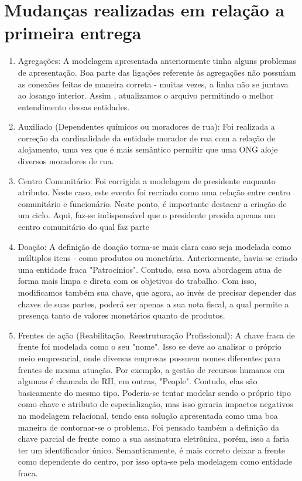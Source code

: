 \section{Mudanças realizadas em relação a primeira entrega}
\label{sec:entidades}

\begin{enumerate}
    \item Agregações: A modelagem apresentada anteriormente tinha alguns problemas de apresentação. Boa parte das ligações referente às agregações não possuíam as conexões feitas de maneira correta - muitas vezes, a linha não se juntava ao losango interior. Assim , atualizamos o arquivo permitindo o melhor entendimento dessas entidades.
    \item Auxiliado (Dependentes químicos ou moradores de rua): Foi realizada a correção da cardinalidade da entidade morador de rua com a relação de alojamento, uma vez que é mais semântico permitir que uma ONG aloje diversos moradores de rua.
    \item Centro Comunitário: Foi corrigida a modelagem de presidente enquanto atributo. Neste caso, este evento foi recriado como uma relação entre centro comunitário e funcionário. Neste ponto, é importante destacar a criação de um ciclo. Aqui, faz-se indispensável que o presidente presida apenas um centro comunitário do qual faz parte
    \item Doação: A definição de doação torna-se mais clara caso seja modelada como múltiplos itens - como produtos ou monetária. Anteriormente, havia-se criado uma entidade fraca "Patrocínios". Contudo, essa nova abordagem atua de forma mais limpa e direta com os objetivos do trabalho. Com isso, modificamos também sua chave, que agora, ao invés de precisar depender das chaves de suas partes, poderá ser apenas a sua nota fiscal, a qual permite a presença tanto de valores monetários quanto de produtos.
    \item Frentes de ação (Reabilitação, Reestruturação Profissional): A chave fraca de frente foi modelada como o seu "nome". Isso se deve ao analisar o próprio meio empresarial, onde diversas empresas possuem nomes diferentes para frentes de mesma atuação. Por exemplo, a gestão de recursos humanos em algumas é chamada de RH, em outras, "People". Contudo, elas são basicamente do mesmo tipo. Poderia-se tentar modelar sendo o próprio tipo como chave e atributo de especialização, mas isso geraria impactos negativos na modelagem relacional, tendo essa solução apresentada como uma boa maneira de contornar-se o problema. Foi pensado também a definição da chave parcial de frente como a sua assinatura eletrônica, porém, isso a faria ter um identificador único. Semanticamente, é mais correto deixar a frente como dependente do centro, por isso opta-se pela modelagem como entidade fraca.

\end{enumerate}
